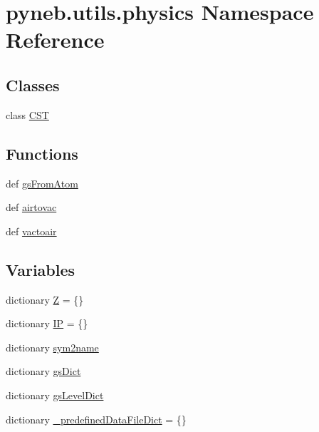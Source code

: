 \hypertarget{namespacepyneb_1_1utils_1_1physics}{\section{pyneb.\-utils.\-physics Namespace Reference}
\label{namespacepyneb_1_1utils_1_1physics}
}
\subsection*{Classes}
\begin{DoxyCompactItemize}
\item 
class \hyperlink{classpyneb_1_1utils_1_1physics_1_1_c_s_t}{C\-S\-T}
\end{DoxyCompactItemize}
\subsection*{Functions}
\begin{DoxyCompactItemize}
\item 
def \hyperlink{namespacepyneb_1_1utils_1_1physics_ad8bb8a1415a2efcc6512044ac8e883f8}{gs\-From\-Atom}
\item 
def \hyperlink{namespacepyneb_1_1utils_1_1physics_aa6c19471b62528a32df5b8c371e69057}{airtovac}
\item 
def \hyperlink{namespacepyneb_1_1utils_1_1physics_ae7f2ba7fc89983bb4d9fa50eb37f4b36}{vactoair}
\end{DoxyCompactItemize}
\subsection*{Variables}
\begin{DoxyCompactItemize}
\item 
dictionary \hyperlink{namespacepyneb_1_1utils_1_1physics_a95c816e1c7b8be2daeb4feb64868f210}{Z} = \{\}
\item 
dictionary \hyperlink{namespacepyneb_1_1utils_1_1physics_a041738a1b0abdb597dd654aec4d96757}{I\-P} = \{\}
\item 
dictionary \hyperlink{namespacepyneb_1_1utils_1_1physics_aaad8df22981701858aa5539c86a96b5b}{sym2name}
\item 
dictionary \hyperlink{namespacepyneb_1_1utils_1_1physics_a1960e51460ec0d63ffe40b02e0280186}{gs\-Dict}
\item 
dictionary \hyperlink{namespacepyneb_1_1utils_1_1physics_a18b749f74e825f8a60744ecba2078ce2}{gs\-Level\-Dict}
\item 
dictionary \hyperlink{namespacepyneb_1_1utils_1_1physics_a07a026669fde4152bdb02f243cc4f4d4}{\-\_\-predefined\-Data\-File\-Dict} = \{\}
\end{DoxyCompactItemize}


